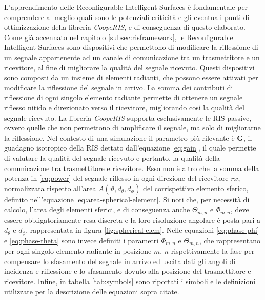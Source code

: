 L'apprendimento delle Reconfigurable Intelligent Surfaces è fondamentale per comprendere
al meglio quali sono le potenziali criticità e gli eventuali punti di ottimizzazione
della libreria \textit{CoopeRIS}, e di conseguenza di questo elaborato. Come già
accennato nel capitolo \ref{subsec:risframework}, le Reconfigurable Intelligent Surfaces
sono dispositivi che permettono di modificare la riflessione di un segnale appartenente
ad un canale di comunicazione tra un trasmettitore e un ricevitore, al fine di
migliorare la qualità del segnale ricevuto. Questi dispositivi sono composti da un
insieme di elementi radianti, che possono essere attivati per modificare la
riflessione del segnale in arrivo. La somma dei contributi di riflessione di ogni
singolo elemento radiante permette di ottenere un segnale riflesso nitido e direzionato
verso il ricevitore, migliorando così la qualità del segnale ricevuto. La libreria
\textit{CoopeRIS} supporta esclusivamente le RIS passive, ovvero quelle che non permettono
di amplificare il segnale, ma solo di migliorarne la riflessione. Nel contesto di
una simulazione il parametro più rilevante è $\textbf{G}$, il guadagno
isotropico della RIS dettato dall'equazione \ref{eq:gain}, il quale permette di valutare
la qualità del segnale ricevuto e pertanto, la qualità della comunicazione tra
trasmettitore e ricevitore. Esso non è altro che la somma della potenza in \ref{eq:power}
del segnale riflesso in ogni direzione del ricevitore $rx$, normalizzata
rispetto all'area $A(\vartheta, d_{\theta}, d_{\phi})$ del corrispettivo
elemento sferico, definito nell'equazione \ref{eq:area-spherical-element}. Si
noti che, per necessità di calcolo, l'area degli elementi sferici, e di conseguenza
anche $\Theta_{m,n}$ e $\Phi_{m,n}$, deve essere obbligatoriamente resa discreta
e la loro risoluzione angolare è posta pari a $d_{\theta}$ e $d_{\phi}$, rappresentata
in figura \ref{fig:spherical-elem}. Nelle equazioni \ref{eq:phase-phi} e
\ref{eq:phase-theta} sono invece definiti i parametri $\Phi_{m,n}$ e
$\Theta_{m,n}$, che rappresentano per ogni singolo elemento radiante in posizione
$m$, $n$ rispettivamente la fase per compensare lo sfasamento del segnale in
arrivo ed uscita dati gli angoli di incidenza e riflessione e lo sfasamento
dovuto alla posizione del trasmettitore e ricevitore. Infine, in tabella
\ref{tab:symbols} sono riportati i simboli e le definizioni utilizzate per la
descrizione delle equazioni sopra citate.

